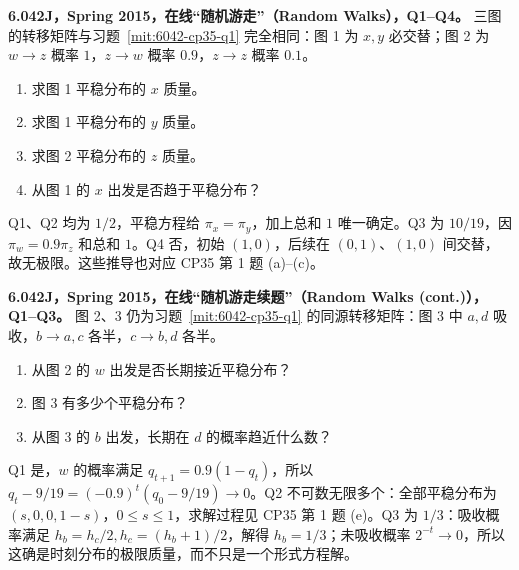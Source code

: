 \begin{exercise}
\textbf{6.042J，Spring 2015，在线“随机游走”（Random Walks），Q1--Q4。}
三图的转移矩阵与习题~\ref{mit:6042-cp35-q1} 完全相同：图 1 为 $x,y$ 必交替；图 2 为 $w\to z$ 概率 $1$，$z\to w$ 概率 $0.9$，$z\to z$ 概率 $0.1$。
\begin{enumerate}[label=Q\arabic*.]
\item\label{mit:6042-online-random-walks-q1} 求图 1 平稳分布的 $x$ 质量。
\item\label{mit:6042-online-random-walks-q2} 求图 1 平稳分布的 $y$ 质量。
\item\label{mit:6042-online-random-walks-q3} 求图 2 平稳分布的 $z$ 质量。
\item\label{mit:6042-online-random-walks-q4} 从图 1 的 $x$ 出发是否趋于平稳分布？
\end{enumerate}
\end{exercise}
\begin{solution}
Q1、Q2 均为 $1/2$，平稳方程给 $\pi_x=\pi_y$，加上总和 $1$ 唯一确定。Q3 为 $10/19$，因 $\pi_w=0.9\pi_z$ 和总和 $1$。Q4 否，初始 $(1,0)$，后续在 $(0,1)$、$(1,0)$ 间交替，故无极限。这些推导也对应 CP35 第 1 题 (a)--(c)。
\end{solution}

\begin{exercise}
\textbf{6.042J，Spring 2015，在线“随机游走续题”（Random Walks (cont.)），Q1--Q3。}
图 2、3 仍为习题~\ref{mit:6042-cp35-q1} 的同源转移矩阵：图 3 中 $a,d$ 吸收，$b\to a,c$ 各半，$c\to b,d$ 各半。
\begin{enumerate}[label=Q\arabic*.]
\item\label{mit:6042-online-random-walks-cont-q1} 从图 2 的 $w$ 出发是否长期接近平稳分布？
\item\label{mit:6042-online-random-walks-cont-q2} 图 3 有多少个平稳分布？
\item\label{mit:6042-online-random-walks-cont-q3} 从图 3 的 $b$ 出发，长期在 $d$ 的概率趋近什么数？
\end{enumerate}
\end{exercise}
\begin{solution}
Q1 是，$w$ 的概率满足 $q_{t+1}=0.9(1-q_t)$，所以 $q_t-9/19=(-0.9)^t(q_0-9/19)\to0$。Q2 不可数无限多个：全部平稳分布为 $(s,0,0,1-s)$，$0\le s\le1$，求解过程见 CP35 第 1 题 (e)。Q3 为 $1/3$：吸收概率满足 $h_b=h_c/2,h_c=(h_b+1)/2$，解得 $h_b=1/3$；未吸收概率 $2^{-t}\to0$，所以这确是时刻分布的极限质量，而不只是一个形式方程解。
\end{solution}

